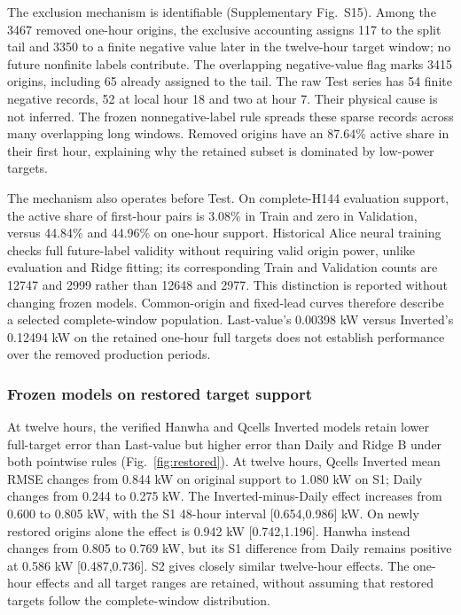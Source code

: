 \documentclass[aip,reprint,floatfix,amsmath,amssymb]{revtex4-2}
\begin{document}
The exclusion mechanism is identifiable (Supplementary Fig.~S15). Among the 3467 removed one-hour origins, the exclusive accounting assigns 117 to the split tail and 3350 to a finite negative value later in the twelve-hour target window; no future nonfinite labels contribute. The overlapping negative-value flag marks 3415 origins, including 65 already assigned to the tail. The raw Test series has 54 finite negative records, 52 at local hour 18 and two at hour 7. Their physical cause is not inferred. The frozen nonnegative-label rule spreads these sparse records across many overlapping long windows. Removed origins have an 87.64\% active share in their first hour, explaining why the retained subset is dominated by low-power targets.

The mechanism also operates before Test. On complete-H144 evaluation support, the active share of first-hour pairs is 3.08\% in Train and zero in Validation, versus 44.84\% and 44.96\% on one-hour support. Historical Alice neural training checks full future-label validity without requiring valid origin power, unlike evaluation and Ridge fitting; its corresponding Train and Validation counts are 12747 and 2999 rather than 12648 and 2977. This distinction is reported without changing frozen models. Common-origin and fixed-lead curves therefore describe a selected complete-window population. Last-value's 0.00398 kW versus Inverted's 0.12494 kW on the retained one-hour full targets does not establish performance over the removed production periods.



\subsubsection{Frozen models on restored target support}
At twelve hours, the verified Hanwha and Qcells Inverted models retain lower full-target error than Last-value but higher error than Daily and Ridge B under both pointwise rules (Fig.~\ref{fig:restored}). At twelve hours, Qcells Inverted mean RMSE changes from 0.844 kW on original support to 1.080 kW on S1; Daily changes from 0.244 to 0.275 kW. The Inverted-minus-Daily effect increases from 0.600 to 0.805 kW, with the S1 48-hour interval [0.654,0.986] kW. On newly restored origins alone the effect is 0.942 kW [0.742,1.196]. Hanwha instead changes from 0.805 to 0.769 kW, but its S1 difference from Daily remains positive at 0.586 kW [0.487,0.736]. S2 gives closely similar twelve-hour effects. The one-hour effects and all target ranges are retained, without assuming that restored targets follow the complete-window distribution.
\end{document}
